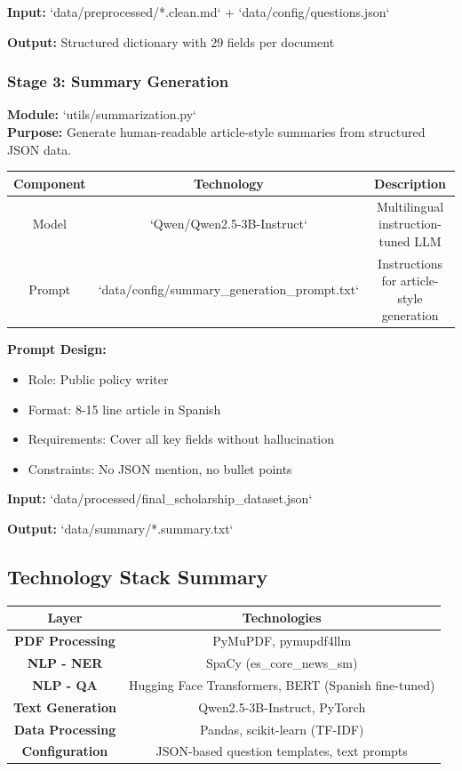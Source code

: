 \documentclass{article}
\begin{document}
\textbf{Input:} `data/preprocessed/*.clean.md` + `data/config/questions.json`

\textbf{Output:} Structured dictionary with 29 fields per document

\subsubsection{Stage 3: Summary Generation}

\textbf{Module:} `utils/summarization.py` \\
\textbf{Purpose:} Generate human-readable article-style summaries from structured JSON data.

\begin{center}
\begin{tabular}{ |c|c|c| } 
 \hline
Component & Technology & Description \\
 \hline\hline
 Model & `Qwen/Qwen2.5-3B-Instruct` & Multilingual instruction-tuned LLM \\
 Prompt & `data/config/summary\_generation\_prompt.txt` & Instructions for article-style generation \\
 \hline
\end{tabular}
\end{center}

\textbf{Prompt Design:}
\begin{itemize}
\item Role: Public policy writer
\item Format: 8-15 line article in Spanish
\item Requirements: Cover all key fields without hallucination
\item Constraints: No JSON mention, no bullet points
\end{itemize}

\textbf{Input:} `data/processed/final\_scholarship\_dataset.json`

\textbf{Output:} `data/summary/*.summary.txt`

\subsection{Technology Stack Summary}

\begin{center}
\begin{tabular}{ |c|c| } 
 \hline
Layer & Technologies \\
 \hline\hline
 \textbf{PDF Processing} & PyMuPDF, pymupdf4llm \\
 \textbf{NLP - NER} & SpaCy (es\_core\_news\_sm) \\
 \textbf{NLP - QA} & Hugging Face Transformers, BERT (Spanish fine-tuned) \\
 \textbf{Text Generation} & Qwen2.5-3B-Instruct, PyTorch \\
 \textbf{Data Processing} & Pandas, scikit-learn (TF-IDF) \\
 \textbf{Configuration} & JSON-based question templates, text prompts \\
 \hline
\end{tabular}
\end{center}
\end{document}
